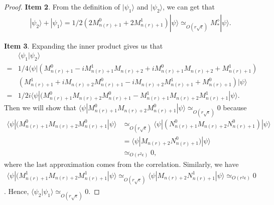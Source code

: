 \documentclass[11pt,letterpaper]{article}
\newcommand{\ket}[1]{|#1\rangle}
\newcommand{\bra}[1]{\langle#1|}
\newcommand{\braket}[2]{\langle#1|#2\rangle}
\newcommand{\1}{\mathbb{1}}
\newcommand{\nr}{n(r)}
\newcommand{\ep}{\epsilon}
\newcommand{\se}{\sqrt{\epsilon}}
\newcommand{\appd}[1]{\simeq_{#1}}
\theoremstyle{definition}
\begin{document}
\begin{proof}
	\textbf{Item 2}. From the definition of $\ket{\psi_1}$ and $\ket{\psi_2}$, we can get that 
	\begin{align}
		\ket{\psi_2} + \ket{\psi_1} = 1/2( 2M_{\nr+1}^0 + 2M_{\nr+1}^1) \ket{\psi} \appd{O(r\se)} M_\ast^\diamond \ket{\psi}.
	\end{align}
	
	\textbf{Item 3}. Expanding the inner product gives us that 
	\begin{align*}
		&\braket{\psi_1}{\psi_2}\\
	 = &1/4\bra{\psi}(M_{\nr+1}^0 - iM_{\nr+1}^1M_{\nr+2} + iM_{\nr+1}^0M_{\nr+2} +M_{\nr+1}^1)\\
	 &(M_{\nr+1}^1 + iM_{\nr+2}M_{\nr+1}^0 -iM_{\nr+2}M_{\nr+1}^1 + M_{\nr+1}^0)\ket{\psi}\\
	 =& 1/2i \bra{\psi}(M_{\nr+1}^0M_{\nr+2}M_{\nr+1}^0-M_{\nr+1}^1M_{\nr+2}M_{\nr+1}^1\ket{\psi}.
	\end{align*}
	Then we will show that $\bra{\psi} M_{\nr+1}^0M_{\nr+2}M_{\nr+1}^0 \ket{\psi} \appd{O( r\se)} 0$ because
	\begin{align}
	 \bra{\psi}(M_{\nr+1}^0M_{\nr+2}M_{\nr+1}^0\ket{\psi} &\appd{O(r\se)}  \bra{\psi}(N_{\nr+1}^0M_{\nr+2}N_{\nr+1}^0)\ket{\psi}\\
	  &=\bra{\psi}M_{\nr+2}N_{\nr+1}^0)\ket{\psi}\\
	&\appd{O(r^2\ep)} 0,
	\end{align}
	where the last approximation comes from the correlation.
	Similarly, we have 
	\begin{align}
	\bra{\psi}(M_{\nr+1}^1M_{\nr+2}M_{\nr+1}^1\ket{\psi} \appd{O(r\se)} \bra{\psi} M_{\nr+2}N_{\nr+1}^1 \ket{\psi} \appd{O(r^2\ep)} 0
	\end{align}.
	Hence, $\braket{\psi_2}{\psi_1} \appd{O(r\se)} 0$.
	

\end{proof}
\end{document}
